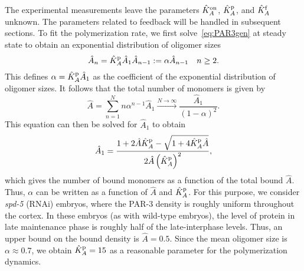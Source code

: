 \documentclass[11pt]{article}
\newcommand{\6}[1]{#1_{\text{6}}}
\newcommand{\3}[1]{#1_{\text{3}}}
\begin{document}
The experimental measurements leave the parameters $\hat{K}^\text{on}_A$, $\hat{K}^\text{p}_A$, and $\hat{K}^\text{f}_A$ unknown. The parameters related to feedback will be handled in subsequent sections. To fit the polymerization rate, we first solve\ \eqref{eq:PAR3gen} at steady state to obtain an exponential distribution of oligomer sizes \cite{edelstein1998models,lang2022oligomerization}
\begin{equation}
\label{eq:QSS}
\hat A_n =  \hat{K}^\text{p}_A \hat A_1 \hat A_{n-1}:=\alpha \hat A_{n-1} \quad n \geq 2.
\end{equation}
This defines $\alpha= \hat{K}^\text{p}_A \hat A_1$ as the coefficient of the exponential distribution of oligomer sizes. It follows that the total number of monomers is given by 
\begin{equation}
\hat A = \sum_{n=1}^N n \alpha^{n-1} \hat A_1 \xrightarrow{N \rightarrow \infty} \frac{\hat A_1}{\left(1-\alpha\right)^2}.
\end{equation}
This equation can then be solved for $\hat A_1$ to obtain \cite[Eq.~(12)]{lang2022oligomerization}
\begin{equation}
\label{eq:AmonA}
\hat A_1 = \frac{1+2\hat A \hat{K}^\text{p}_A-\sqrt{1+4 \hat{K}^\text{p}_A \hat A}}{2 \hat A \left(\hat{K}^\text{p}_A\right)^2},
\end{equation}
which gives the number of bound monomers as a function of the total bound $\hat A$. Thus, $\alpha$ can be written as a function of $\hat A$ and $\hat{K}^\text{p}_A$. For this purpose, we consider \textit{spd-5} (RNAi) embryos, where the PAR-3 density is roughly uniform throughout the cortex. In these embryos (as with wild-type embryos), the level of protein in late maintenance phase is roughly half of the late-interphase levels. Thus, an upper bound on the bound density is $\hat A=0.5$. Since the mean oligomer size is $\alpha \approx 0.7$, we obtain $\hat{K}^\text{p}_A = 15$ as a reasonable parameter for the polymerization dynamics.
\end{document}
